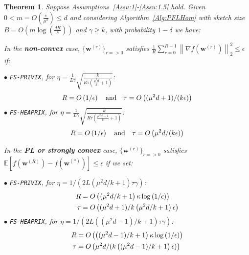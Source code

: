 \documentclass[twoside]{article}
\newtheorem{theorem}{Theorem}
\begin{document}
\begin{theorem}\label{thm:homog_case}
Suppose Assumptions~\ref{Assu:1}-\ref{Assu:1.5} hold. 
Given $0<m=O\left(\frac{e}{\mu^2}\right)\leq d$ and considering Algorithm~\ref{Alg:PFLHom} with sketch size $B=O\left(m\log\left(\frac{d R}{\delta}\right)\right)$ and $\gamma\geq k$, with probability $1-\delta$ we have:

In the \textbf{non-convex} case, $\{ {\boldsymbol{w}}^{(r)}\}_{r=>0}$ satisfies  $\frac{1}{R}\sum_{r=0}^{R-1}\left\|\nabla f({\boldsymbol{w}}^{(r)})\right\|_2^2\leq {\epsilon}$ if: 
 
\noindent $\bullet$ \texttt{FS-PRIVIX}, for $\eta=\frac{1}{L\gamma}\sqrt{\frac{k}{R\tau\left(\frac{\mu^2d}{k}+1\right)}}$:    
\begin{equation}\notag
R=O\left(1/\epsilon\right) \quad \textrm{and} \quad \tau=O\left((\mu^2d+1)/(k\epsilon)\right)
 \end{equation}
\noindent $\bullet$ \texttt{FS-HEAPRIX}, for $\eta=\frac{1}{L\gamma}\sqrt{\frac{k}{R\tau\left(\frac{\mu^2d-1}{k}+1\right)}}$:
\begin{equation}\notag
R=O\left(1/\epsilon\right) \quad \textrm{and} \quad \tau=O\left(\mu^2d/(k\epsilon)\right)
 \end{equation}

 
In the \textbf{PL or strongly convex} case, $\{ {\boldsymbol{w}}^{(r)}\}_{r=>0}$ satisfies $\mathbb{E}[f({\boldsymbol{w}}^{(R)})-f({\boldsymbol{w}}^{(*)})]\leq \epsilon$ if  we set:  

\noindent $\bullet$ \texttt{FS-PRIVIX}, for $\eta=1/(2L(\mu^2d/k+1)\tau\gamma)$:    
\begin{equation}\notag
\begin{split}
R&=O\left(\left(\mu^2d/k+1\right)\kappa\log\left(1/\epsilon\right)\right)\\
\tau&=O\left((\mu^2d+1)/k\left(\mu^2d/k+1\right)\epsilon\right)
  \end{split}
 \end{equation}
\noindent $\bullet$ \texttt{FS-HEAPRIX}, for $\eta=1/(2L((\mu^2d-1)/k+1)\tau\gamma)$:    
\begin{equation}\notag
\begin{split}
R& = O\left(\left((\mu^2d-1)/k+1\right)\kappa\log\left(1/\epsilon\right)\right)\\
 \tau &=O\left(\mu^2d/(k\left((\mu^2d-1)/k+1\right)\epsilon)\right)
  \end{split}
 \end{equation}


\end{theorem}
\end{document}
